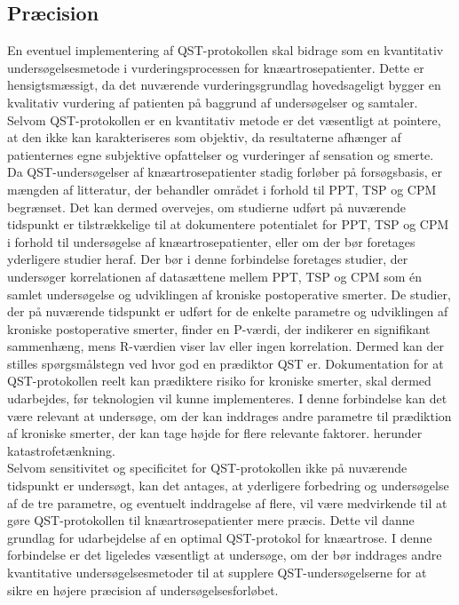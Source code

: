 \subsection{Præcision} \label{Praecision} %
En eventuel implementering af QST-protokollen skal bidrage som en kvantitativ undersøgelsesmetode i vurderingsprocessen for knæartrosepatienter. Dette er hensigtsmæssigt, da det nuværende vurderingsgrundlag hovedsageligt bygger en kvalitativ vurdering af patienten på baggrund af undersøgelser og samtaler. Selvom QST-protokollen er en kvantitativ metode er det væsentligt at pointere, at den ikke kan karakteriseres som objektiv, da resultaterne afhænger af patienternes egne subjektive opfattelser og vurderinger af sensation og smerte.\\ 
Da QST-undersøgelser af knæartrosepatienter stadig forløber på forsøgsbasis, er mængden af litteratur, der behandler området i forhold til PPT, TSP og CPM  begrænset. Det kan dermed overvejes, om studierne udført på nuværende tidspunkt er tilstrækkelige til at dokumentere potentialet for PPT, TSP og CPM i forhold til undersøgelse af knæartrosepatienter, eller om der bør foretages yderligere studier heraf. Der bør i denne forbindelse foretages studier, der undersøger korrelationen af datasættene mellem PPT, TSP og CPM som én samlet undersøgelse og udviklingen af kroniske postoperative smerter. De studier, der på nuværende tidspunkt er udført for de enkelte parametre og udviklingen af kroniske postoperative smerter, finder en P-værdi, der indikerer en signifikant sammenhæng, mens R-værdien viser lav eller ingen korrelation. Dermed kan der stilles spørgsmålstegn ved hvor god en prædiktor QST er. Dokumentation for at QST-protokollen reelt kan prædiktere risiko for kroniske smerter, skal dermed udarbejdes, før teknologien vil kunne implementeres. I denne forbindelse kan det være relevant at undersøge, om der kan inddrages andre parametre til prædiktion af kroniske smerter, der kan tage højde for flere relevante faktorer. herunder katastrofetænkning.\\
Selvom sensitivitet og specificitet for QST-protokollen ikke på nuværende tidspunkt er undersøgt, kan det antages, at yderligere forbedring og undersøgelse af de tre parametre, og eventuelt inddragelse af flere, vil være medvirkende til at gøre QST-protokollen til knæartrosepatienter mere præcis. Dette vil danne grundlag for udarbejdelse af en optimal QST-protokol for knæartrose. I denne forbindelse er det ligeledes væsentligt at undersøge, om der bør inddrages andre kvantitative undersøgelsesmetoder til at supplere QST-undersøgelserne for at sikre en højere præcision af undersøgelsesforløbet. \\
